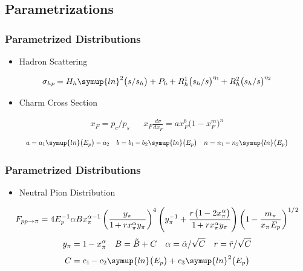 	\subsection{Parametrizations}

	\begin{frame}
		\frametitle{Parametrized Distributions}
		\begin{itemize}
			\item Hadron Scattering
		\end{itemize}
			\begin{equation*}
				\sigma_{hp} \kern-0.5pt = H_h \symup{ln}^2 \bigl( s / s_h \bigr) + P_h \kern-0.5pt +
				R_h^1 \bigl( s_h / s \bigr)^{\eta_1} \kern-1pt + R_h^2 \bigl( s_h / s \bigr)^{\eta_2}
			\end{equation*}
		\begin{itemize}
			\item Charm Cross Section
		\end{itemize}
			\vspace{-1em}
			\begin{align*}
				&&&&&&&& x_F = p_c / p_s && x_F \frac{d \sigma}{d x_F} = a x_F^b \bigl( 1 - x_F^m \bigr)^n &&&&&&&&
			\end{align*}
			\begin{align*}
				&&&&&& a = a_1 \symup{ln} \bigl( E_p \bigr) - a_2 &&
				b = b_1 \kern-1pt - b_2 \symup{ln} \bigl( E_p \bigr) &&
				n = n_1 \kern-1pt - n_2\symup{ln} \bigl( E_p \bigr) &&&&&&
			\end{align*}
	\end{frame}

	\begin{frame}
		\addtocounter{framenumber}{-1}
		\frametitle{Parametrized Distributions}
		\begin{itemize}
			\item Neutral Pion Distribution
		\end{itemize}
			\begin{align*}
				F_{pp \rightarrow \pi} = 4 E_p^{-1} \alpha B x_\pi^{\alpha - 1}
				\left( \frac{y_\pi}{1 \kern-1pt + r x_\pi^\alpha y_\pi} \right)^4
				\left( y_\pi^{-1} + \frac{r \kern+1pt \bigl( 1 \kern-0.5pt - 2x_\pi^\alpha \bigr)}{1 \kern-1pt + r x_\pi^\alpha y_\pi} \right)
				\left( 1 \kern-0.5pt - \frac{m_\pi}{x_\pi \kern+0.5pt E_p} \right)^{1/ \kern+0.5pt 2}
			\end{align*}
			\begin{align*}
				&&&&&& y_\pi = 1 \kern-0.5pt - x_\pi^\alpha &&
				B = \tilde{B} + C && \alpha = \tilde{\alpha} / \sqrt{C} && r = \tilde{r} / \sqrt{C} &&&&&&
			\end{align*}
			\begin{align*}
				C = c_1 \kern-1pt - c_2 \symup{ln} \bigl( E_p \bigr) + c_3 \symup{ln}^2 \bigl( E_p \bigr)
			\end{align*}
	\end{frame}

